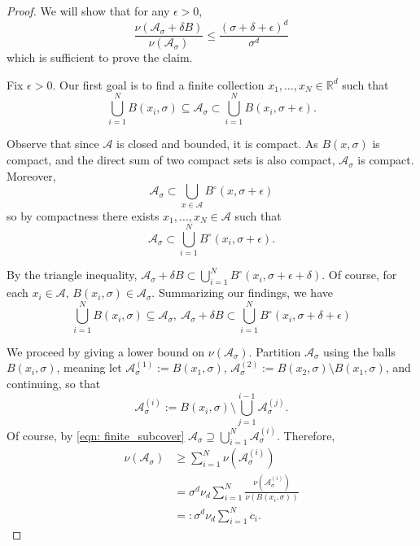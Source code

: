 \documentclass{article}
\newcommand{\Reals}{\mathbb{R}}
\newcommand{\Rd}{\Reals^d}
\newcommand{\Aset}{\mathcal{A}}
\newcommand{\Asig}{\Aset_{\sigma}}
\newcommand{\1}{\mathbf{1}}
\theoremstyle{alden}
\theoremstyle{aldenthm}
\theoremstyle{remark}
\begin{document}
\begin{proof}
	We will show that for any $\epsilon > 0$, 
	\begin{equation}
	\label{eqn: ratio_of_volume}
	\frac{\nu(\Asig + \delta B)}{\nu(\Asig)} \leq \frac{(\sigma + \delta + \epsilon)^d}{\sigma^d}
	\end{equation}
	which is sufficient to prove the claim.
	
	
	Fix $\epsilon > 0$. Our first goal is to find a finite collection $x_1, \ldots, x_N \in \Rd$ such that
	\begin{equation*}
	\bigcup_{i = 1}^{N} B(x_i, \sigma) \subseteq \Asig \subset \bigcup_{i = 1}^{N} B(x_i, \sigma + \epsilon). \tag{$N := N(\epsilon)$}
	\end{equation*}
	
	Observe that since $\Aset$ is closed and bounded, it is compact. As $B(x,\sigma)$ is compact, and the direct sum of two compact sets is also compact, $\Asig$ is compact. Moreover,
	\begin{equation*}
	\Asig \subset \bigcup_{x \in \Aset} B^{\circ}(x,\sigma + \epsilon)
	\end{equation*}
	so by compactness there exists $x_1, \ldots,x_N \in \Aset$ such that
	\begin{equation*}
	\Asig \subset \bigcup_{i = 1}^{N} B^{\circ}(x_i,\sigma + \epsilon).
	\end{equation*}
	
	By the triangle inequality, $\Asig + \delta B \subset \bigcup_{i = 1}^{N} B^{\circ}(x_i,\sigma + \epsilon + \delta)$. Of course, for each $x_i \in \Aset$, $B(x_i,\sigma) \in \Asig$. Summarizing our findings, we have
	\begin{equation}
	\label{eqn: finite_subcover}
	\bigcup_{i = 1}^{N} B(x_i,\sigma) \subseteq \Asig  ,~\Asig + \delta B \subset \bigcup_{i = 1}^{N} B^{\circ}(x_i,\sigma + \delta + \epsilon)
	\end{equation}

	We proceed by giving a lower bound on $\nu(\Asig)$. Partition $\Asig$ using the balls $B(x_i,\sigma)$, meaning let $\Aset_{\sigma}^{(1)} := B(x_1,\sigma)$, $\Aset_{\sigma}^{(2)} := B(x_2,\sigma) \setminus B(x_1,\sigma)$, and continuing, so that
	\begin{equation*}
	\Aset_{\sigma}^{(i)} := B(x_i,\sigma) \setminus \bigcup_{j = 1}^{i - 1} \Aset_{\sigma}^{(j)}. \tag{$i = 1,\ldots,N$}
	\end{equation*}
	Of course, by \eqref{eqn: finite_subcover} $\Asig \supseteq \bigcup_{i = 1}^{N} \Asig^{(i)}$. Therefore,
	\begin{align*}
	\nu(\Asig) & \geq \sum_{i = 1}^{N} \nu(\Asig^{(i)}) \\
	& = \sigma^d \nu_d \sum_{i = 1}^{N}  \frac{\nu(\Asig^{(i)})}{\nu(B(x_i,\sigma))} \\
	& =: \sigma^d \nu_d \sum_{i = 1}^{N} c_i.
	\end{align*}
	

\end{proof}
\end{document}
